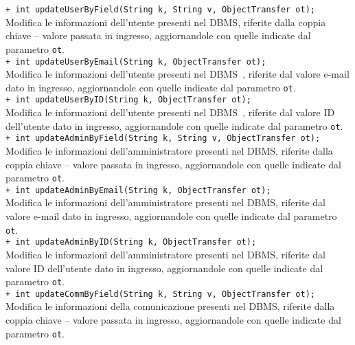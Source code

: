 {\begin{sloppypar}
{{{{\begin{itemize}
{				\texttt{+ int updateUserByField(String k, String v, ObjectTransfer ot);} \\
				Modifica le informazioni dell'utente presenti nel DBMS\g, riferite dalla coppia chiave – valore passata in ingresso, aggiornandole con quelle indicate dal parametro \texttt{ot}.\\
				
				\texttt{+ int updateUserByEmail(String k, ObjectTransfer ot);} \\
				Modifica le informazioni dell'utente presenti nel DBMS\g~, riferite dal valore e-mail dato in ingresso, aggiornandole con quelle indicate dal parametro \texttt{ot}.\\
				
				\texttt{+ int updateUserByID(String k, ObjectTransfer ot);} \\
				Modifica le informazioni dell'utente presenti nel DBMS\g~, riferite dal valore ID dell'utente dato in ingresso, aggiornandole con quelle indicate dal parametro \texttt{ot}.\\
				
				\texttt{+ int updateAdminByField(String k, String v, ObjectTransfer ot);} \\
				Modifica le informazioni dell'amministratore presenti nel DBMS\g, riferite dalla coppia chiave – valore passata in ingresso, aggiornandole con quelle indicate dal parametro \texttt{ot}.\\
				
				\texttt{+ int updateAdminByEmail(String k, ObjectTransfer ot);} \\
				Modifica le informazioni dell'amministratore presenti nel DBMS\g, riferite dal valore e-mail dato in ingresso, aggiornandole con quelle indicate dal parametro \texttt{ot}.\\
				
				\texttt{+ int updateAdminByID(String k, ObjectTransfer ot);} \\
				Modifica le informazioni dell'amministratore presenti nel DBMS\g, riferite dal valore ID dell'utente dato in ingresso, aggiornandole con quelle indicate dal parametro \texttt{ot}.\\
				
				\texttt{+ int updateCommByField(String k, String v, ObjectTransfer ot);} \\
				Modifica le informazioni della comunicazione presenti nel DBMS\g, riferite dalla coppia chiave – valore passata in ingresso, aggiornandole con quelle indicate dal parametro \texttt{ot}.\\
				
}
\end{itemize}}}}}
\end{sloppypar}}
